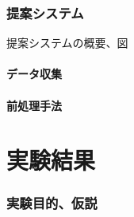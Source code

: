 \documentclass{ltjarticle}
\begin{document}
\section{提案システム}
提案システムの概要、図
\subsection{データ収集}
\subsection{前処理手法}

\newpage
\part{実験結果}
\section{実験目的、仮説}
\end{document}
